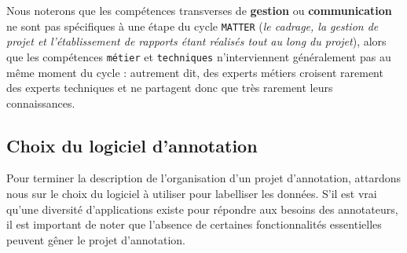 		Nous noterons que les compétences transverses de \textbf{gestion} ou \textbf{communication} ne sont pas spécifiques à une étape du cycle \texttt{MATTER} (\textit{le cadrage, la gestion de projet et l'établissement de rapports étant réalisés tout au long du projet}), alors que les compétences \texttt{métier} et \texttt{techniques} n'interviennent généralement pas au même moment du cycle : autrement dit, des experts métiers croisent rarement des experts techniques et ne partagent donc que très rarement leurs connaissances.
	
	
	\subsection{Choix du logiciel d'annotation}
	\label{section:2.2.3-ORGANISATION-ANNOTATION-LOGICIELS}
	
		Pour terminer la description de l'organisation d'un projet d'annotation, attardons nous sur le choix du logiciel à utiliser pour labelliser les données.
		S'il est vrai qu'une diversité d'applications existe pour répondre aux besoins des annotateurs, il est important de noter que l'absence de certaines fonctionnalités essentielles peuvent gêner le projet d'annotation.
		
